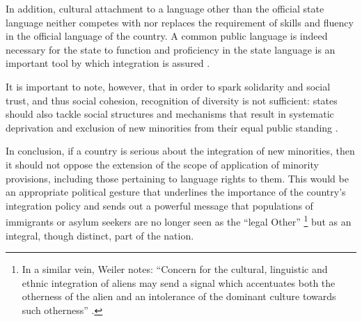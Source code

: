 \documentclass[output=paper,colorlinks,citecolor=brown]{langscibook}
\begin{document}
In addition, cultural attachment to a language other than the official state language neither competes with nor replaces the requirement of skills and fluency in the official language of the country. A common public language is indeed necessary for the state to function and proficiency in the state language is an important tool by which integration is assured \citep{poggeschi2013}.

It is important to note, however, that in order to spark solidarity and social trust, and thus social cohesion, recognition of diversity is not sufficient: states should also tackle social structures and mechanisms that result in systematic deprivation and exclusion of new minorities from their equal public standing \citep{balint_latour2013}.

In conclusion, if a country is serious about the integration of new minorities, then it should not oppose the extension of the scope of application of minority provisions, including those pertaining to language rights to them. This would be an appropriate political gesture that underlines the importance of the country's integration policy and sends out a powerful message that populations of immigrants or asylum seekers are no longer seen as the ``legal Other'' \citep{acosta_arcarazo2011}\footnote{In a similar vein, Weiler notes: ``Concern for the cultural, linguistic and ethnic integration of aliens may send a signal which accentuates both the otherness of the alien and an intolerance of the dominant culture towards such otherness'' \citep{weiler1992}.} but as an integral, though distinct, part of the nation.
\end{document}
